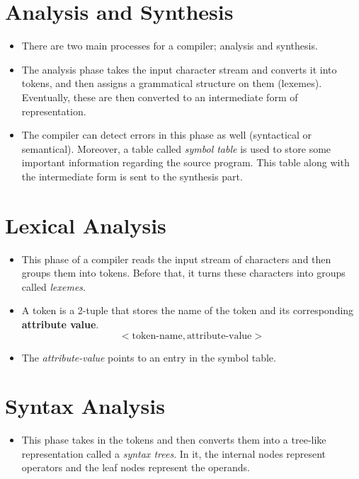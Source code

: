 \documentclass[hidelinks]{article}
\begin{document}
\section{Analysis and Synthesis}
    \begin{itemize}
        \item There are two main processes for a compiler; analysis and synthesis. 
        \item The analysis phase takes the input character stream and converts it into tokens, and then assigns a grammatical structure on them (lexemes). Eventually, these are then converted to an intermediate form of representation.
        \item The compiler can detect errors in this phase as well (syntactical or semantical). Moreover, a table called \textit{symbol table} is used to store some important information regarding the source program. This table along with the intermediate form is sent to the synthesis part.
    \end{itemize}

\section{Lexical Analysis}
    \begin{itemize}
        \item This phase of a compiler reads the input stream of characters and then groups them into tokens. Before that, it turns these characters into groups called \textit{lexemes}.
        \item A token is a 2-tuple that stores the name of the token and its corresponding \textbf{attribute value}.
        $$<\text{token-name}, \text{attribute-value}>$$
        \item The \textit{attribute-value} points to an entry in the symbol table.
    \end{itemize}

\section{Syntax Analysis}
    \begin{itemize}
        \item This phase takes in the tokens and then converts them into a tree-like representation called a \textit{syntax trees}. In it, the internal nodes represent operators and the leaf nodes represent the operands.
    \end{itemize}
\end{document}
